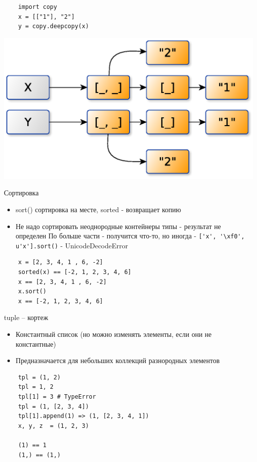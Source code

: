 \documentclass{article}
\begin{document}
\begin{lstlisting}
	import copy
	x = [["1"], "2"]
	y = copy.deepcopy(x)
\end{lstlisting}
\includegraphics[scale=0.8]{images/refs3.eps}

\newpage

\begin{center} Сортировка \end{center}
\begin{itemize}
	\item sort() сортировка на месте, sorted - возвращает копию
	\item Не надо сортировать неоднородные контейнеры типы - результат не определен
		По больше части - получится что-то, но иногда -
		\lstinline!['x', '\xf0', u'x'].sort()! - UnicodeDecodeError
\end{itemize}
\begin{lstlisting}
	x = [2, 3, 4, 1 , 6, -2]
	sorted(x) == [-2, 1, 2, 3, 4, 6]
	x == [2, 3, 4, 1 , 6, -2]
	x.sort()
	x == [-2, 1, 2, 3, 4, 6]
\end{lstlisting}
\newpage

\begin{center} tuple – кортеж \end{center}
\begin{itemize}
	\item Константный список (но можно изменять элементы, если они не константные)
	\item Предназначается для небольших коллекций разнородных элементов
\end{itemize}
\vspace{15pt}
\begin{lstlisting}
	tpl = (1, 2)
	tpl = 1, 2
	tpl[1] = 3 # TypeError
	tpl = (1, [2, 3, 4])
	tpl[1].append(1) => (1, [2, 3, 4, 1])
	x, y, z  = (1, 2, 3)

	(1) == 1
	(1,) == (1,)
\end{lstlisting}
\newpage
\end{document}
